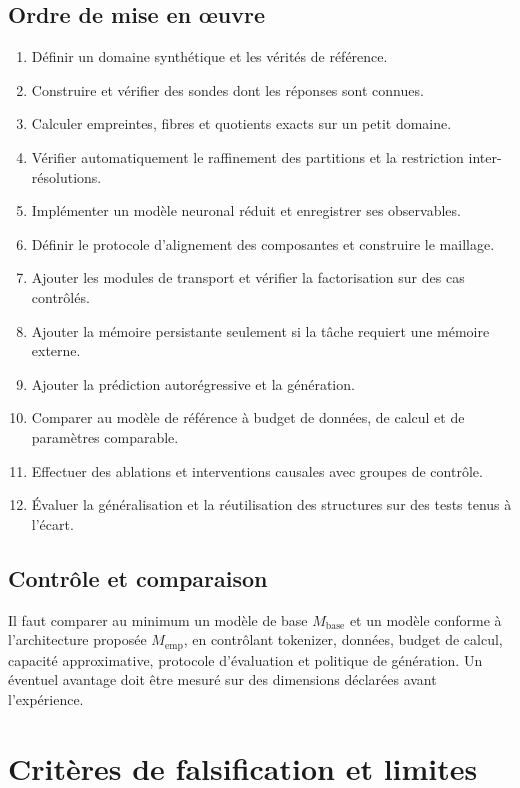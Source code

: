\documentclass[11pt,a4paper]{article}
\theoremstyle{remark}
\newcommand{\1}{\mathbf 1}
\begin{document}
\subsection{Ordre de mise en œuvre}
\begin{enumerate}[label=\arabic*.]
  \item Définir un domaine synthétique et les vérités de référence.
  \item Construire et vérifier des sondes dont les réponses sont connues.
  \item Calculer empreintes, fibres et quotients exacts sur un petit domaine.
  \item Vérifier automatiquement le raffinement des partitions et la restriction inter-résolutions.
  \item Implémenter un modèle neuronal réduit et enregistrer ses observables.
  \item Définir le protocole d'alignement des composantes et construire le maillage.
  \item Ajouter les modules de transport et vérifier la factorisation sur des cas contrôlés.
  \item Ajouter la mémoire persistante seulement si la tâche requiert une mémoire externe.
  \item Ajouter la prédiction autorégressive et la génération.
  \item Comparer au modèle de référence à budget de données, de calcul et de paramètres comparable.
  \item Effectuer des ablations et interventions causales avec groupes de contrôle.
  \item Évaluer la généralisation et la réutilisation des structures sur des tests tenus à l'écart.
\end{enumerate}

\subsection{Contrôle et comparaison}
Il faut comparer au minimum un modèle de base $M_{\mathrm{base}}$ et un modèle conforme à l'architecture proposée $M_{\mathrm{emp}}$, en contrôlant tokenizer, données, budget de calcul, capacité approximative, protocole d'évaluation et politique de génération. Un éventuel avantage doit être mesuré sur des dimensions déclarées avant l'expérience.

\section{Critères de falsification et limites}
\end{document}
